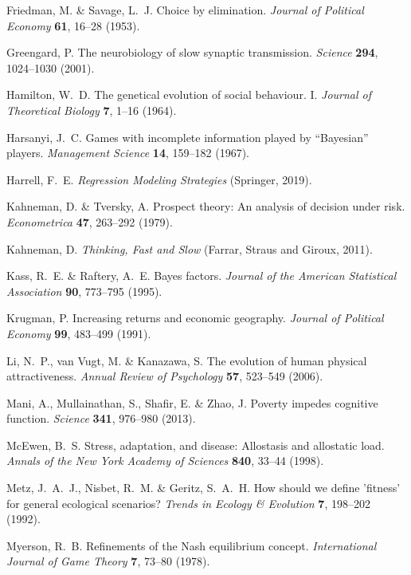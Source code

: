\documentclass[11pt,twocolumn]{article}
\begin{document}
\begin{thebibliography}{30}
Friedman, M. \& Savage, L.~J. Choice by elimination. {\em Journal of Political Economy} {\bf 61}, 16--28 (1953).

Greengard, P. The neurobiology of slow synaptic transmission. {\em Science} {\bf 294}, 1024--1030 (2001).

Hamilton, W.~D. The genetical evolution of social behaviour. I. {\em Journal of Theoretical Biology} {\bf 7}, 1--16 (1964).

Harsanyi, J.~C. Games with incomplete information played by ``Bayesian'' players. {\em Management Science} {\bf 14}, 159--182 (1967).

Harrell, F.~E. {\em Regression Modeling Strategies} (Springer, 2019).

Kahneman, D. \& Tversky, A. Prospect theory: An analysis of decision under risk. {\em Econometrica} {\bf 47}, 263--292 (1979).

Kahneman, D. {\em Thinking, Fast and Slow} (Farrar, Straus and Giroux, 2011).

Kass, R.~E. \& Raftery, A.~E. Bayes factors. {\em Journal of the American Statistical Association} {\bf 90}, 773--795 (1995).

Krugman, P. Increasing returns and economic geography. {\em Journal of Political Economy} {\bf 99}, 483--499 (1991).

Li, N.~P., van Vugt, M. \& Kanazawa, S. The evolution of human physical attractiveness. {\em Annual Review of Psychology} {\bf 57}, 523--549 (2006).

Mani, A., Mullainathan, S., Shafir, E. \& Zhao, J. Poverty impedes cognitive function. {\em Science} {\bf 341}, 976--980 (2013).

McEwen, B.~S. Stress, adaptation, and disease: Allostasis and allostatic load. {\em Annals of the New York Academy of Sciences} {\bf 840}, 33--44 (1998).

Metz, J.~A.~J., Nisbet, R.~M. \& Geritz, S.~A.~H. How should we define 'fitness' for general ecological scenarios? {\em Trends in Ecology \& Evolution} {\bf 7}, 198--202 (1992).

Myerson, R.~B. Refinements of the Nash equilibrium concept. {\em International Journal of Game Theory} {\bf 7}, 73--80 (1978).


\end{thebibliography}
\end{document}
